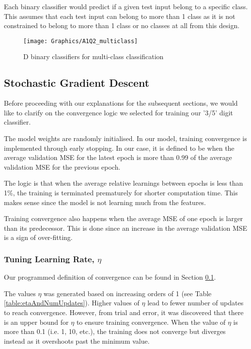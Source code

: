 \documentclass[a4paper,12pt]{article}
\begin{document}
Each binary classifier would predict if a given test input belong to a specific class. This assumes that each test input can belong to more than 1 class as it is not constrained to belong to more than 1 class or no classes at all from this design. 

\begin{figure}[!htb]
	\centering
	\texttt{[image: Graphics/A1Q2\_multiclass]}
    \caption{\label{figure:multiclass}D binary classifiers for multi-class 
    	classification}
\end{figure}

\clearpage
\subsection{Stochastic Gradient Descent}
\label{section:convergence}
Before proceeding with our explanations for the subsequent sections, we would like to clarify on the convergence logic we selected for training our '3/5' digit classifier.

The model weights are randomly initialised. In our model, training convergence is implemented through early stopping. In our case, it is defined to be when the average validation MSE for the latest epoch is more than 0.99 of the average validation MSE for the previous epoch.

The logic is that when the average relative learnings between epochs is less than 1\%, the training is terminated prematurely for shorter computation time. This makes sense since the model is not learning much from the features. 

Training convergence also happens when the average MSE of one epoch is larger than its predecessor. This is done since an increase in the average validation MSE is a sign of over-fitting.

\subsubsection{Tuning Learning Rate, $\eta$}
Our programmed definition of convergence can be found in Section \ref{section:convergence}. 

The values $\eta$ was generated based on increasing orders of 1 (see Table \ref{table:etaAndNumUpdates}). Higher values of $\eta$ lead to fewer number of updates to reach convergence. However, from trial and error, it was discovered that there is an upper bound for $\eta$ to ensure training convergence. When the value of $\eta$ is more than 0.1 (i.e. 1, 10, etc.), the training does not converge but diverges instead as it overshoots past the minimum value. 
\end{document}
